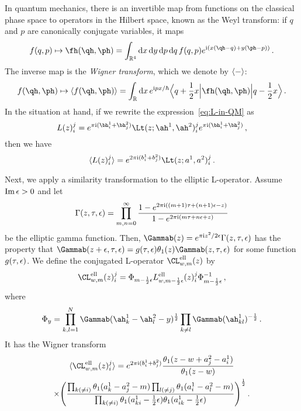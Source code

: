 In quantum mechanics, there is an invertible map from functions on the
classical phase space to operators in the Hilbert space, known as the
Weyl transform: if $q$ and $p$ are canonically conjugate variables, it
maps
\begin{equation}
  f(q,p)
  \mapsto
  \fh(\qh,\ph)
  =
  \int_{\R^4}
  \rmd x \, \rmd y \, \rmd p \, \rmd q \,
  f(q,p)
  e^{\iu(x(\qh - q) + y(\ph - p))} \,.
\end{equation}
The inverse map is the \emph{Wigner transform}, which we denote by
$\langle - \rangle$:
\begin{equation}
  f(\qh,\ph)
  \mapsto
  \vev{f(\qh,\ph)}
  = \int_\R \rmd x \, e^{\iu px/\hbar}
  \Bigbra{q + \frac12 x} \fh(\qh,\ph) \Bigket{q - \frac12 x} \,.
\end{equation}
In the situation at hand, if we rewrite the
expression~\eqref{eq:L-in-QM} as
\begin{equation}
  L(z)_i^j
  =
  e^{\pi\iu(\bh_i^1 + \bh_j^2)}
  \Lt(z; \ah^1, \ah^2)_i^j
  e^{\pi\iu(\bh_i^1 + \bh_j^2)}
  \,,
\end{equation}
then we have
\begin{equation}
  \vev{L(z)_i^j}
  =
  e^{2\pi\iu(b_i^1 + b_j^2)} \Lt(z; a^1, a^2)_i^j \,.
\end{equation}

Next, we apply a similarity transformation to the elliptic L-operator.
Assume $\mathop{\mathrm{Im}}\nolimits\epsilon > 0$ and let
\begin{equation}
  \Gamma(z,\tau,\epsilon)
  =
  \prod_{m,n=0}^\infty
  \frac{1 - e^{2\pi\mathrm{i}((m+1)\tau + (n+1)\epsilon - z)}}
       {1 - e^{2\pi\mathrm{i}(m\tau + n\epsilon + z)}}
\end{equation}
be the elliptic gamma function.  Then,
$\Gammab(z) = e^{\pi\iu z^2/2\eps} \Gamma(z,\tau,\eps)$ has the
property that
$\Gammab(z + \eps, \tau,\eps) = g(\tau,\eps) \theta_1(z) \Gammab(z,
\tau,\eps)$ for some function $g(\tau,\epsilon)$.  We define the
conjugated L-operator $\CL^{\text{ell}}_{w,m}(z)$ by
\begin{equation}
  \CL^{\text{ell}}_{w,m}(z)_i^j
  =
  \Phi_{m-\frac12\eps}
  L^{\text{ell}}_{w,m - \frac12\eps}(z)_i^j
  \Phi_{m-\frac12\eps}^{-1} \,,
\end{equation}
where
\begin{equation}
  \Phi_y
  =
  \prod_{k,l=1}^N \Gammab(\ah^1_k - \ah^2_l - y)^{\frac12}
  \prod_{k \neq l} \Gammab(\ah^1_{kl})^{-\frac12} \,.
\end{equation}
It has the Wigner transform
\begin{multline}
  \vev{\CL^{\text{ell}}_{w,m}(z)_i^j}
  =
  e^{2\pi\iu(b_i^1 + b_j^2)}
  \frac{\theta_1(z - w + a^2_j - a^1_i)}{\theta_1(z - w)}
  \\
  \times
  \Biggl(
  \frac{\prod_{k (\neq i)} \theta_1(a^1_k - a^2_j - m)
        \prod_{l (\neq j)} \theta_1(a^1_i - a^2_l - m)}
       {\prod_{k (\neq i)}\theta_1(a^1_{ki} - \frac12\eps)
        \theta_1(a^1_{ik} - \frac12\eps)}
  \Biggr)^{\frac12}
  \,.
\end{multline}

